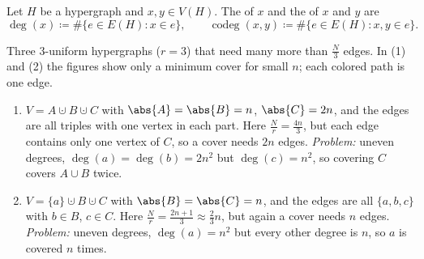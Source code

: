 \begin{definition}\label{def:codegree}
    Let \(H\) be a hypergraph and \(x, y \in V(H)\). The  of \(x\) and the  of \(x\) and \(y\) are
    \[
        \deg(x) \coloneqq \#\{ e \in E(H) : x \in e \},
        \qquad
        \operatorname{codeg}(x,y) \coloneqq \#\{ e \in E(H) : x, y \in e \}.
    \]
\end{definition}

\begin{eg}\label{eg:cover-bad}
    Three \(3\)-uniform hypergraphs (\(r = 3\)) that need many more than \(\frac{N}{3}\) edges. In (1) and (2) the figures show only a minimum cover for small \(n\); each colored path is one edge.
    \begin{enumerate}[(1)]
        \item \(V = A \cupdot B \cupdot C\) with \(\abs{A} = \abs{B} = n\), \(\abs{C} = 2n\), and the edges are all triples with one vertex in each part. Here \(\frac{N}{r} = \frac{4n}{3}\), but each edge contains only one vertex of \(C\), so a cover needs \(2n\) edges. \emph{Problem:} uneven degrees, \(\deg(a) = \deg(b) = 2n^{2}\) but \(\deg(c) = n^{2}\), so covering \(C\) covers \(A \cup B\) twice.
        \begin{center}
        \end{center}
        \item \(V = \{a\} \cupdot B \cupdot C\) with \(\abs{B} = \abs{C} = n\), and the edges are all \(\{a, b, c\}\) with \(b \in B\), \(c \in C\). Here \(\frac{N}{r} = \frac{2n+1}{3} \approx \frac{2}{3}n\), but again a cover needs \(n\) edges. \emph{Problem:} uneven degrees, \(\deg(a) = n^{2}\) but every other degree is \(n\), so \(a\) is covered \(n\) times.

\end{enumerate}
\end{eg}

